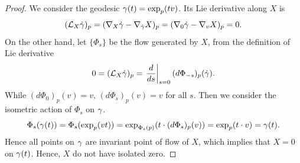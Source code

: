 \documentclass[11pt, a4paper]{article}
\theoremstyle{plain}
\theoremstyle{definition}
\theoremstyle{remark}
\begin{document}
\begin{proof}
    We consider the geodesic $\gamma(t) = \exp_p(tv)$. Its Lie derivative along $X$ is 
    \[(\mathcal{L}_{X}\dot{\gamma})_p = (\nabla_X \dot{\gamma} - \nabla_{\dot{\gamma}} X)_p = (\nabla_0 \dot{\gamma} - \nabla_v X)_p = 0.\]
    On the other hand, let $\{\Phi_s\}$ be the flow generated by $X$, from the definition of Lie derivative
    \[0 = (\mathcal{L}_{X}\dot{\gamma})_p = \left.\frac{d}{ds}\right|_{s = 0} (d\Phi_{-s})_p(\dot{\gamma}).\]
    While $(d\Phi_0)_p(v) = v$, $(d\Phi_s)_p (v) = v$ for all $s$. Then we consider the isometric action of $\Phi_s$ on $\gamma$.
    \[\Phi_s(\gamma(t)) = \Phi_s(\exp_p(vt)) = \exp_{\Phi_s(p)}(t\cdot (d\Phi_s)_p(v)) = \exp_p (t\cdot v) =\gamma(t).\]
    Hence all points on $\gamma$ are invariant point of flow of $X$, which implies that $X=0$ on $\gamma(t)$. Hence, $X$ do not have isolated zero.
    
    
\end{proof}
\end{document}
